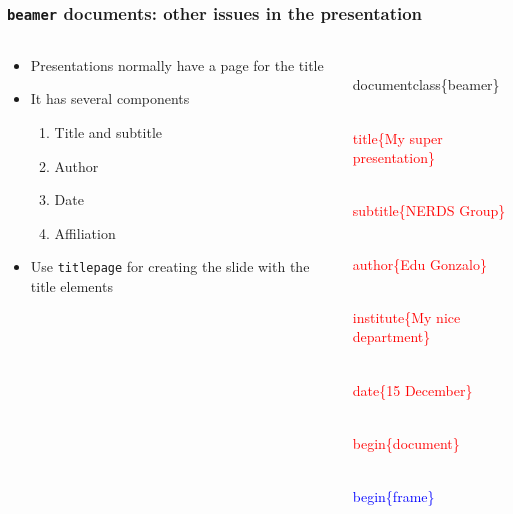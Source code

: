 \documentclass[10pt]{beamer}
\newcommand{\words}{\textcolor{blue}}
\newcommand{\code}{\textcolor{red}}
\begin{document}
\begin{frame}
\frametitle{\texttt{beamer} documents: other issues in the presentation}

    
   \begin{columns}
       
       
 \begin{column}{0.5\textwidth}
   \begin{itemize}
   \item Presentations normally have a page for the title
   \item It has several components 
  

       \begin{enumerate}
         \item Title and subtitle
         \item Author
         \item Date
         \item Affiliation

       \end{enumerate}
  
  \item Use \texttt{titlepage} for creating the slide with the title elements
  
  \end{itemize}    
      
 \end{column}
 
\begin{column}{0.6\textwidth}
   
   
 \begin{semiverbatim}
   
\\documentclass\{beamer\}

\code{ \\title\{My super presentation\}}

 \code{\\subtitle\{NERDS Group\}}
 
  \code{\\author\{Edu Gonzalo\}}
  
   \code{\\institute\{My nice department\}}
 
  \code{\\date\{15 December\}}
 
\code{\\begin\{document\}}

\words{\\begin\{frame\}}


\end{semiverbatim}
\end{column}
\end{columns}
\end{frame}
\end{document}
